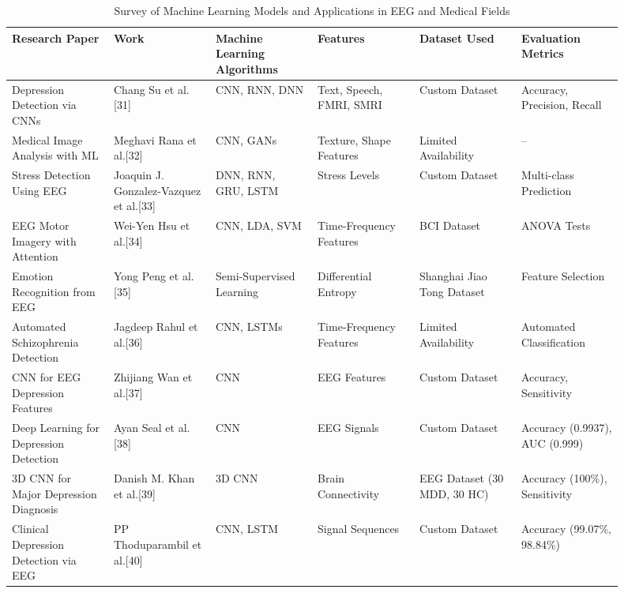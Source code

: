 \documentclass[conference]{IEEEtran}
\begin{document}
\begin{table*}
  \centering
  \caption{Survey of Machine Learning Models and Applications in EEG and Medical Fields}
  \label{tab:ml_survey}
  \renewcommand{\arraystretch}{1.5}
  \begin{adjustbox}{max width=\linewidth,center}
  \begin{tabular}{|p{0.15\linewidth}|p{0.15\linewidth}|p{0.15\linewidth}|p{0.15\linewidth}|p{0.15\linewidth}|p{0.15\linewidth}|}
    \hline
    \textbf{Research Paper} & \textbf{Work} & \textbf{Machine Learning Algorithms} & \textbf{Features} & \textbf{Dataset Used} & \textbf{Evaluation Metrics} \\ \hline

    Depression Detection via CNNs & Chang Su et al.[31] & CNN, RNN, DNN & Text, Speech, FMRI, SMRI & Custom Dataset & Accuracy, Precision, Recall \\ \hline
    Medical Image Analysis with ML & Meghavi Rana et al.[32] & CNN, GANs & Texture, Shape Features & Limited Availability & -- \\ \hline
    Stress Detection Using EEG & Joaquin J. Gonzalez-Vazquez et al.[33] & DNN, RNN, GRU, LSTM & Stress Levels & Custom Dataset & Multi-class Prediction \\ \hline
    EEG Motor Imagery with Attention & Wei-Yen Hsu et al.[34] & CNN, LDA, SVM & Time-Frequency Features & BCI Dataset & ANOVA Tests \\ \hline
    Emotion Recognition from EEG & Yong Peng et al.[35] & Semi-Supervised Learning & Differential Entropy & Shanghai Jiao Tong Dataset & Feature Selection \\ \hline
    Automated Schizophrenia Detection & Jagdeep Rahul et al.[36] & CNN, LSTMs & Time-Frequency Features & Limited Availability & Automated Classification \\ \hline
    CNN for EEG Depression Features & Zhijiang Wan et al.[37] & CNN & EEG Features & Custom Dataset & Accuracy, Sensitivity \\ \hline
    Deep Learning for Depression Detection & Ayan Seal et al.[38] & CNN & EEG Signals & Custom Dataset & Accuracy (0.9937), AUC (0.999) \\ \hline
    3D CNN for Major Depression Diagnosis & Danish M. Khan et al.[39] & 3D CNN & Brain Connectivity & EEG Dataset (30 MDD, 30 HC) & Accuracy (100\%), Sensitivity \\ \hline
    Clinical Depression Detection via EEG & PP Thoduparambil et al.[40] & CNN, LSTM & Signal Sequences & Custom Dataset & Accuracy (99.07\%, 98.84\%) \\ \hline

\end{tabular}
\end{adjustbox}
\end{table*}
\end{document}
